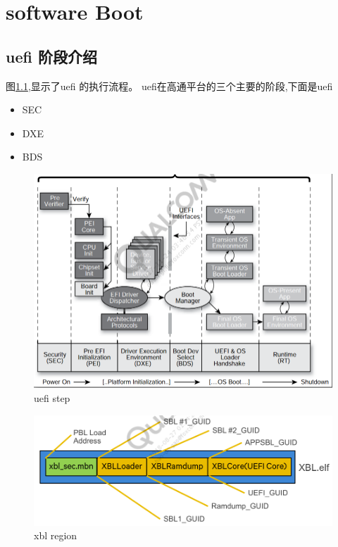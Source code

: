 \chapter{software Boot\label{uefiflow} }

\section{uefi 阶段介绍}

图\ref{step},显示了uefi 的执行流程。
uefi在高通平台的三个主要的阶段,下面是uefi 




\begin{itemize}

\item SEC

\item DXE

\item BDS

\end{itemize}

\begin{figure}
\begin{center}
\includegraphics[width=13cm]{img/ueficompon}
\caption{uefi step}
\label{step}
\end{center}
\vspace{-0.5em}
\end{figure}



\begin{figure}[htbp]
\begin{center}
\includegraphics[width=13cm]{img/xbl_reg}
\caption{xbl region}
\label{xblreg}
\end{center}
\vspace{-0.5em}
\end{figure}


